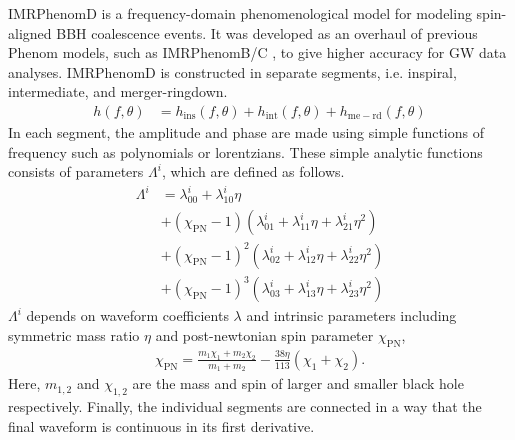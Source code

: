 \documentclass[twocolumn]{aastex631}
\newcommand{\ripple}{\texttt{ripple}}
\newcommand{\jax}{\texttt{jax}}
\begin{document}
IMRPhenomD is a frequency-domain phenomenological model for modeling spin-aligned BBH coalescence events. It was developed as an overhaul of previous Phenom models, such as  IMRPhenomB/C \cite{santamaria2010matching,ajith2011inspiral}, to give higher accuracy for GW data analyses. 
IMRPhenomD is constructed in separate segments, i.e. inspiral, intermediate, and merger-ringdown. 
\begin{align}
	h(f,\theta)&=h_{\mathrm{ins}}(f,\theta) + h_{\mathrm{int}}(f,\theta) + h_{\mathrm{me-rd}}(f,\theta)
\end{align}
In each segment, the amplitude and phase are made using simple functions of frequency such as polynomials or lorentzians. These simple analytic functions consists of parameters $\Lambda^i$, which are defined as follows.
\begin{align} \label{eq:Lambda}
	\Lambda^i&=\lambda_{00}^i+\lambda_{10}^i\eta \nonumber \\
	&+(\chi_{\mathrm{PN}}-1)(\lambda_{01}^i+\lambda_{11}^i\eta+\lambda_{21}^i\eta^2) \nonumber \\ 
	&+(\chi_{\mathrm{PN}}-1)^2(\lambda_{02}^i+\lambda_{12}^i\eta+\lambda_{22}^i\eta^2) \nonumber \\
	&+(\chi_{\mathrm{PN}}-1)^3(\lambda_{03}^i+\lambda_{13}^i\eta+\lambda_{23}^i\eta^2)
\end{align}
$\Lambda^i$ depends on waveform coefficients $\lambda$ and intrinsic parameters including symmetric mass ratio $\eta$ and post-newtonian spin parameter $\chi_{\mathrm{PN}}$, 
\begin{align}
	\chi_{\mathrm{PN}}=\frac{m_1\chi_1+m_2\chi_2}{m_1+m_2}-\frac{38\eta}{113}(\chi_1+\chi_2).
\end{align}
Here, $m_{1,2}$ and $\chi_{1,2}$ are the mass and spin of larger and smaller black hole respectively. Finally, the individual segments are connected in a way that the final waveform is continuous in its first derivative.
\end{document}
